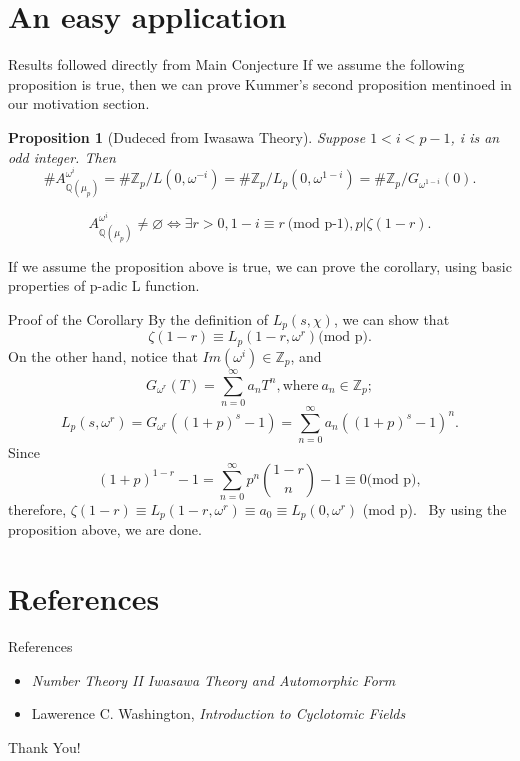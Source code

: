 \documentclass{beamer}
\theoremstyle{plain}
\newtheorem{proposition}{Proposition}[section]
\theoremstyle{definition}
\theoremstyle{remark}
\newcommand{\Q}{\mathbb{Q}}
\newcommand{\Z}{\mathbb{Z}}
\begin{document}
\section{An easy application}
\begin{frame}{Results followed directly from Main Conjecture}
  If we assume the following proposition is true, then we can prove 
  Kummer's second proposition mentinoed in our motivation section.
  \begin{proposition}[Dudeced from Iwasawa Theory]
    Suppose $1<i<p-1$, i is an odd integer. Then
    \[ 
      \# A_{\Q(\mu_p)}^{\omega^i}=\# \Z_p/ L(0,\omega^{-i}) 
      =\# \Z_p/  L_p(0,\omega^{1-i})  
    = \# \Z_p/ G_{\omega^{1-i}} (0). \]
  \end{proposition}
  \begin{corollary}
    \[ A_{\Q(\mu_p)}^{\omega^i} \neq \varnothing \iff \exists r>0, 1-i \equiv r \ \text{(mod p-1)}, p | \zeta(1-r) .\]
  \end{corollary}
  If we assume the proposition above is true, we can prove the corollary, using basic properties of 
  p-adic L function. 
\end{frame}

\begin{frame}{Proof of the Corollary}
  By the definition of $L_p(s,\chi)$, we can show that 
  \[ \zeta(1-r) \equiv L_p(1-r,\omega^r) \text{(mod p)}.\]
  On the other hand, notice that $Im(\omega^i) \in \Z_p$, and \[G_{\omega^r}(T)=\sum_{n=0}^{\infty}a_nT^n, \text{where}\  a_n \in \Z_p ;  \]
  \[L_p(s,\omega^r)=G_{\omega^r}((1+p)^s-1)=\sum_{n=0}^{\infty}a_n((1+p)^s-1)^n.\]
  Since \[(1+p)^{1-r}-1=\sum_{n=0}^{\infty} p^n \binom{1-r}{n} -1 \equiv 0 \text{(mod p)},\]
  therefore, $\zeta(1-r) \equiv L_p(1-r,\omega^r) \equiv a_0 \equiv L_p(0,\omega^r)$ (mod p). \
  By using the proposition above, we are done.

\end{frame}

\section{References}
\begin{frame}{References}
  \begin{itemize}
    \item \textit{Number Theory II Iwasawa Theory and Automorphic Form}
    \item Lawerence C. Washington, \textit{Introduction to Cyclotomic Fields}
  \end{itemize}
\end{frame}

\begin{frame}
  \begin{center}
    Thank You!
  \end{center}
\end{frame}
\end{document}
